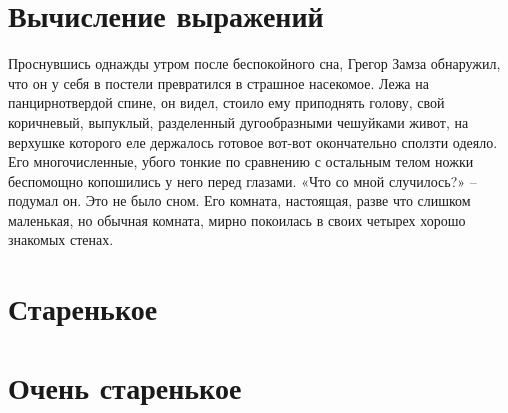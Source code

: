 \chapter{Вычисление выражений}

Проснувшись однажды утром после беспокойного сна, Грегор Замза обнаружил, что
он у себя в постели превратился в страшное насекомое. Лежа на панцирнотвердой
спине, он видел, стоило ему приподнять голову, свой коричневый, выпуклый,
разделенный дугообразными чешуйками живот, на верхушке которого еле держалось
готовое вот-вот окончательно сползти одеяло. Его многочисленные, убого тонкие
по сравнению с остальным телом ножки беспомощно копошились у него перед
глазами. «Что со мной случилось?» – подумал он. Это не было сном. Его комната,
настоящая, разве что слишком маленькая, но обычная комната, мирно покоилась в
своих четырех хорошо знакомых стенах.








\chapter{Старенькое} %








\chapter{Очень старенькое} %









